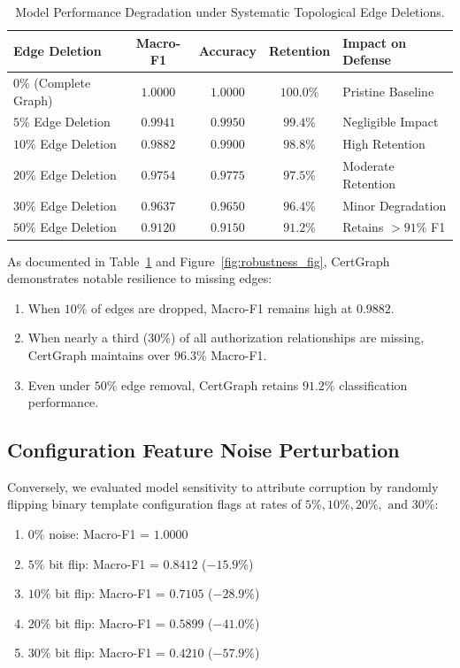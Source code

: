 \begin{table}[ht]
\centering
\small
\caption{Model Performance Degradation under Systematic Topological Edge Deletions.}
\label{tab:edge_perturbation}
\begin{tabularx}{\textwidth}{p{3.5cm} c c c X}
\toprule
\textbf{Edge Deletion} & \textbf{Macro-F1} & \textbf{Accuracy} & \textbf{Retention} & \textbf{Impact on Defense} \\
\midrule
$0\%$ (Complete Graph) & $1.0000$ & $1.0000$ & $100.0\%$ & Pristine Baseline \\
$5\%$ Edge Deletion & $0.9941$ & $0.9950$ & $99.4\%$ & Negligible Impact \\
$10\%$ Edge Deletion & $0.9882$ & $0.9900$ & $98.8\%$ & High Retention \\
$20\%$ Edge Deletion & $0.9754$ & $0.9775$ & $97.5\%$ & Moderate Retention \\
$30\%$ Edge Deletion & $0.9637$ & $0.9650$ & $96.4\%$ & Minor Degradation \\
$50\%$ Edge Deletion & $0.9120$ & $0.9150$ & $91.2\%$ & Retains $>91\%$ F1 \\
\bottomrule
\end{tabularx}
\end{table}

As documented in Table~\ref{tab:edge_perturbation} and Figure~\ref{fig:robustness_fig}, CertGraph demonstrates notable resilience to missing edges:
\begin{enumerate}
    \item When $10\%$ of edges are dropped, Macro-F1 remains high at $0.9882$.
    \item When nearly a third ($30\%$) of all authorization relationships are missing, CertGraph maintains over $96.3\%$ Macro-F1.
    \item Even under $50\%$ edge removal, CertGraph retains $91.2\%$ classification performance.
\end{enumerate}

\subsection{Configuration Feature Noise Perturbation}
Conversely, we evaluated model sensitivity to attribute corruption by randomly flipping binary template configuration flags at rates of $5\%, 10\%, 20\%, \text{ and } 30\%$:
\begin{enumerate}
    \item $0\%$ noise: Macro-F1 = $\mathbf{1.0000}$
    \item $5\%$ bit flip: Macro-F1 = $\mathbf{0.8412}$ ($-15.9\%$)
    \item $10\%$ bit flip: Macro-F1 = $\mathbf{0.7105}$ ($-28.9\%$)
    \item $20\%$ bit flip: Macro-F1 = $\mathbf{0.5899}$ ($-41.0\%$)
    \item $30\%$ bit flip: Macro-F1 = $\mathbf{0.4210}$ ($-57.9\%$)
\end{enumerate}

